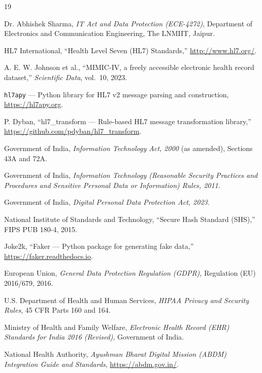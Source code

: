 \documentclass[12pt,a4paper]{report}
\begin{document}
\newpage
\renewcommand{\bibname}{References}
\begin{thebibliography}{19}

Dr. Abhishek Sharma, \textit{IT Act and Data Protection (ECE-4272)}, Department of Electronics and Communication Engineering, The LNMIIT, Jaipur.

HL7 International, ``Health Level Seven (HL7) Standards,'' \url{http://www.hl7.org/}.

A. E. W. Johnson et al., ``MIMIC-IV, a freely accessible electronic health record
dataset,'' \textit{Scientific Data}, vol.~10, 2023.

\texttt{hl7apy} --- Python library for HL7 v2 message parsing and construction,
\url{https://hl7apy.org}.

P. Dyban, ``hl7\_transform --- Rule-based HL7 message transformation library,''
\url{https://github.com/pdyban/hl7_transform}.

Government of India, \textit{Information Technology Act, 2000} (as amended),
Sections 43A and 72A.

Government of India, \textit{Information Technology (Reasonable Security Practices
and Procedures and Sensitive Personal Data or Information) Rules, 2011}.

Government of India, \textit{Digital Personal Data Protection Act, 2023}.

National Institute of Standards and Technology, ``Secure Hash Standard (SHS),''
FIPS PUB 180-4, 2015.

Joke2k, ``Faker --- Python package for generating fake data,''
\url{https://faker.readthedocs.io}.

European Union, \textit{General Data Protection Regulation (GDPR)}, Regulation
(EU) 2016/679, 2016.

U.S. Department of Health and Human Services, \textit{HIPAA Privacy and Security
Rules}, 45 CFR Parts 160 and 164.

Ministry of Health and Family Welfare, \textit{Electronic Health Record (EHR) Standards
for India 2016 (Revised)}, Government of India.

National Health Authority, \textit{Ayushman Bharat Digital Mission (ABDM) Integration
Guide and Standards}, \url{https://abdm.gov.in/}.


\end{thebibliography}
\end{document}
